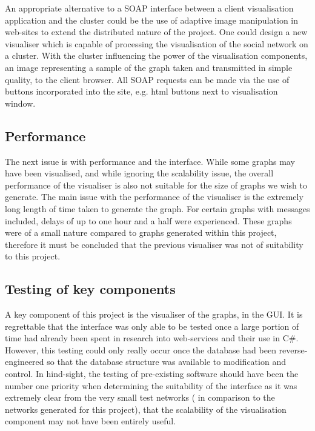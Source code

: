 An appropriate alternative to a SOAP interface between a client visualisation application and the cluster could be the use of adaptive image manipulation in web-sites to extend the distributed nature of the project. One could design a new visualiser which is capable of processing the visualisation of the social network on a cluster. With the cluster influencing the power of the visualisation components, an image representing a sample of the graph taken and transmitted in simple quality, to the client browser. All SOAP requests can be made via the use of buttons incorporated into the site, e.g. html buttons next to visualisation window. 



\subsection{Performance}

The next issue is with performance and the interface. While some graphs may have been visualised, and while ignoring the scalability issue, the overall performance of the visualiser is also not suitable for the size of graphs we wish to generate. The main issue with the performance of the visualiser is the extremely long length of time taken to generate the graph. For certain graphs with messages included, delays of up to one hour and a half were experienced. These graphs were of a small nature compared to graphs generated within this project, therefore it must be concluded that the previous visualiser was not of suitability to this project.

\subsection{Testing of key components}

A key component of this project is the visualiser of the graphs, in the GUI. It is regrettable that the interface was only able to be tested once a large portion of time had already been spent in research into web-services and their use in C\#. However, this testing could only really occur once the database had been reverse-engineered so that the database structure was available to modification and control. In hind-sight, the testing of pre-existing software should have been the number one priority when determining the suitability of the interface as it was extremely clear from the very small test networks ( in comparison to the networks generated for this project), that the scalability of the visualisation component may not have been entirely useful.
